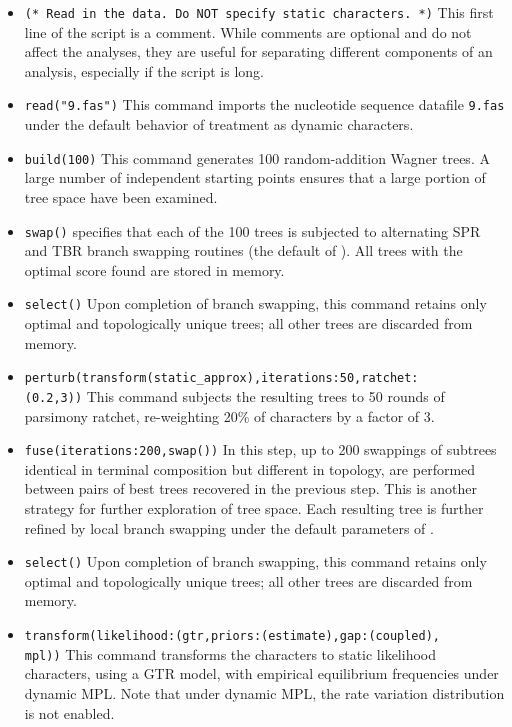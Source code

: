 \begin{itemize}
\item \texttt{(* Read in the data. Do NOT specify static characters. *)} This first line of the script is a comment. While comments are optional and do not affect the analyses, they are useful for separating different components of an analysis, especially if the script is long.
\item \texttt{read("9.fas")}
This command imports the nucleotide sequence datafile \texttt{9.fas} under the default behavior of treatment as dynamic characters.
\item \texttt{build(100)} This command generates 100 random-addition Wagner trees. A large number of independent starting points ensures that a large portion of tree space have been examined.
\item \texttt{swap()}  specifies that each of the 100 trees is subjected to alternating SPR and TBR branch swapping routines (the default of \poy). All trees with the optimal score found are stored in memory.
\item \texttt{select()} Upon completion of branch swapping, this command retains only optimal and topologically unique trees; all other trees are discarded from memory. 
\item \texttt{perturb(transform(static\_approx),iterations:50,ratchet:\\(0.2,3))} This command subjects the resulting trees to 50 rounds of parsimony ratchet, re-weighting 20\% of characters by a factor of 3.
\item \texttt{fuse(iterations:200,swap())} In this step, up to 200 swappings of subtrees identical in terminal composition but different in topology, are performed between pairs of best trees recovered in the previous step. This is another strategy for further exploration of tree space. Each resulting tree is further refined by local branch swapping under the default parameters of .
\item \texttt{select()} Upon completion of branch swapping, this command retains only optimal and topologically unique trees; all other trees are discarded from memory.
\item \texttt{transform(likelihood:(gtr,priors:(estimate),gap:(coupled),\\mpl))} This command transforms the characters to static likelihood characters, using a GTR model, with empirical equilibrium frequencies under dynamic MPL. Note that under dynamic MPL, the rate variation distribution is not enabled.

\end{itemize}
